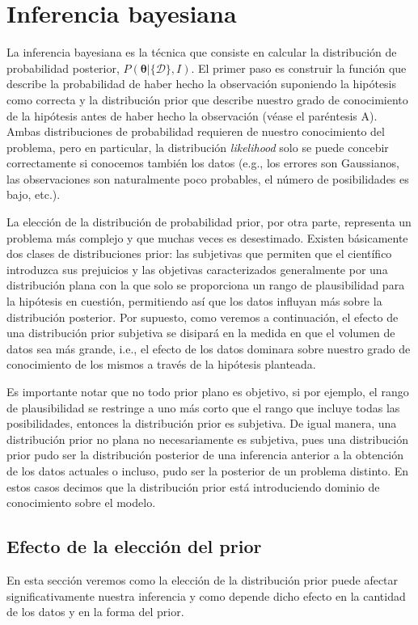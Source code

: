 \documentclass[a4paper,twoside]{article}
\newcommand{\hip}{\ensuremath{\bm{\theta}}\xspace}
\newcommand{\dat}{\ensuremath{\{\mathcal{D}\}}\xspace}
\begin{document}
\section{Inferencia bayesiana}
%
La inferencia bayesiana es la técnica que consiste en calcular la distribución de probabilidad
posterior, $P(\hip|\dat,I)$. El primer paso es construir la función que describe la probabilidad de
haber hecho la observación suponiendo la hipótesis como correcta y la distribución prior que
describe nuestro grado de conocimiento de la hipótesis antes de haber hecho la observación (véase el
paréntesis A). Ambas distribuciones de probabilidad requieren de nuestro conocimiento del problema,
pero en particular, la distribución \emph{likelihood} solo se puede concebir correctamente si
conocemos también los datos (e.g., los errores son Gaussianos, las observaciones son naturalmente
poco probables, el número de posibilidades es bajo, etc.).

La elección de la distribución de probabilidad prior, por otra parte, representa un problema más
complejo y que muchas veces es desestimado. Existen básicamente dos clases de distribuciones prior:
las subjetivas que permiten que el científico introduzca sus prejuicios y las objetivas
caracterizados generalmente por una distribución plana con la que solo se proporciona un rango de
plausibilidad para la hipótesis en cuestión, permitiendo así que los datos influyan más sobre la
distribución posterior. Por supuesto, como veremos a continuación, el efecto de una distribución
prior subjetiva se disipará en la medida en que el volumen de datos sea más grande, i.e., el efecto
de los datos dominara sobre nuestro grado de conocimiento de los mismos a través de la hipótesis
planteada.

Es importante notar que no todo prior plano es objetivo, si por ejemplo, el rango de plausibilidad
se restringe a uno más corto que el rango que incluye todas las posibilidades, entonces la
distribución prior es subjetiva. De igual manera, una distribución prior no plana no necesariamente
es subjetiva, pues una distribución prior pudo ser la distribución posterior de una inferencia
anterior a la obtención de los datos actuales o incluso, pudo ser la posterior de un problema
distinto. En estos casos decimos que la distribución prior está introduciendo dominio de
conocimiento sobre el modelo.

\subsection*{Efecto de la elección del prior}
%
En esta sección veremos como la elección de la distribución prior puede afectar significativamente
nuestra inferencia y como depende dicho efecto en la cantidad de los datos y en la forma del prior.
\end{document}
